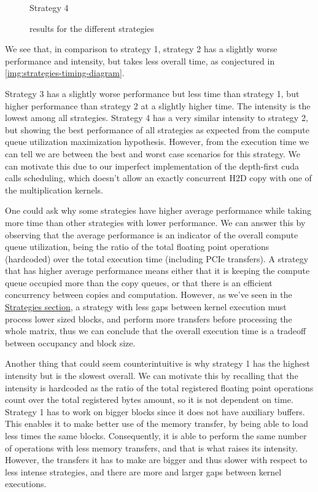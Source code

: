 \begin{figure}[h]
  \caption*{Strategy 4}
  \endminipage\hfill
  \caption{\centering results for the different strategies}\label{img:results-strategies}
\end{figure}


We see that, in comparison to strategy 1, strategy 2 has a slightly worse performance and intensity, but takes less overall time, as conjectured in \ref{img:strategies-timing-diagram}.

Strategy 3 has a slightly worse performance but less time than strategy 1, but higher performance than strategy 2 at a slightly higher time. The intensity is the lowest among all strategies.
Strategy 4 has a very similar intensity to strategy 2, but showing the best performance of all strategies as expected from the compute queue utilization maximization hypothesis. However, from the execution time we can tell we are between the best and worst case scenarios for this strategy. We can motivate this due to our imperfect implementation of the depth-first cuda calls scheduling, which doesn't allow an exactly concurrent H2D copy with one of the multiplication kernels.

One could ask why some strategies have higher average performance while taking more time than other strategies with lower performance. We can answer this by observing that the average performance is an indicator of the overall compute queue utilization, being the ratio of the total floating point operations (hardcoded) over the total execution time (including PCIe transfers). A strategy that has higher average performance means either that it is keeping the compute queue occupied more than the copy queues, or that there is an efficient concurrency between copies and computation. However, as we've seen in the \hyperref[sec:strategies]{Strategies section}, a strategy with less gaps between kernel execution must process lower sized blocks, and perform more transfers before processing the whole matrix, thus we can conclude that the overall execution time is a tradeoff between occupancy and block size.

Another thing that could seem counterintuitive is why strategy 1 has the highest intensity but is the slowest overall. We can motivate this by recalling that the intensity is hardcoded as the ratio of the total registered floating point operations count over the total registered bytes amount, so it is not dependent on time. Strategy 1 has to work on bigger blocks since it does not have auxiliary buffers. This enables it to make better use of the memory transfer, by being able to load less times the same blocks. Consequently, it is able to perform the same number of operations with less memory transfers, and that is what raises its intensity. However, the transfers it has to make are bigger and thus slower with respect to less intense strategies, and there are more and larger gaps between kernel executions.

